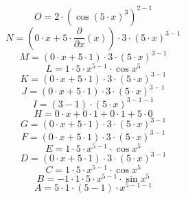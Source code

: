 \documentclass[12pt]{article}
\begin{document}
\begin{equation}
	O = 
2\cdot \left( \cos {\left( 5\cdot x\right) ^{3}}\right) ^{2 - 1}
\end{equation}
\begin{equation}
	N = 
\left( 0\cdot x + 5\cdot \frac{\partial}{\partial x}\left( x\right) \right) \cdot 3\cdot \left( 5\cdot x\right) ^{3 - 1}
\end{equation}
\begin{equation}
	M = 
\left( 0\cdot x + 5\cdot 1\right) \cdot 3\cdot \left( 5\cdot x\right) ^{3 - 1}
\end{equation}
\begin{equation}
	L = 
1\cdot 5\cdot x^{5 - 1}\cdot \cos {x^{5}}
\end{equation}
\begin{equation}
	K = 
\left( 0\cdot x + 5\cdot 1\right) \cdot 3\cdot \left( 5\cdot x\right) ^{3 - 1}
\end{equation}
\begin{equation}
	J = 
\left( 0\cdot x + 5\cdot 1\right) \cdot 3\cdot \left( 5\cdot x\right) ^{3 - 1}
\end{equation}
\begin{equation}
	I = 
\left( 3 - 1\right) \cdot \left( 5\cdot x\right) ^{3 - 1 - 1}
\end{equation}
\begin{equation}
	H = 
0\cdot x + 0\cdot 1 + 0\cdot 1 + 5\cdot 0
\end{equation}
\begin{equation}
	G = 
\left( 0\cdot x + 5\cdot 1\right) \cdot 3\cdot \left( 5\cdot x\right) ^{3 - 1}
\end{equation}
\begin{equation}
	F = 
\left( 0\cdot x + 5\cdot 1\right) \cdot 3\cdot \left( 5\cdot x\right) ^{3 - 1}
\end{equation}
\begin{equation}
	E = 
1\cdot 5\cdot x^{5 - 1}\cdot \cos {x^{5}}
\end{equation}
\begin{equation}
	D = 
\left( 0\cdot x + 5\cdot 1\right) \cdot 3\cdot \left( 5\cdot x\right) ^{3 - 1}
\end{equation}
\begin{equation}
	C = 
1\cdot 5\cdot x^{5 - 1}\cdot \cos {x^{5}}
\end{equation}
\begin{equation}
	B = 
-1\cdot 1\cdot 5\cdot x^{5 - 1}\cdot \sin {x^{5}}
\end{equation}
\begin{equation}
	A = 
5\cdot 1\cdot \left( 5 - 1\right) \cdot x^{5 - 1 - 1}
\end{equation}
\end{document}
